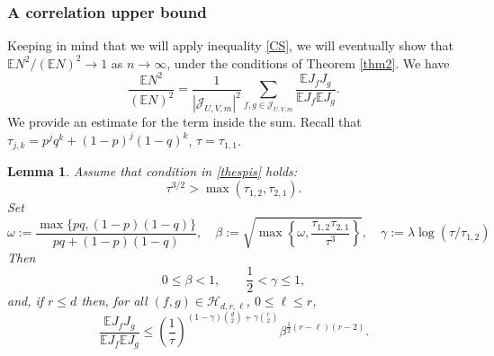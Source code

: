 \documentclass[reqno]{amsart}
\theoremstyle{theorem}
\newtheorem{lemma}[theorem]{Lemma}
\theoremstyle{definition}
\theoremstyle{remark}
\def\E{\mathbb{E}}
\def\HH{\mathscr{H}}
\newcommand{\1}{{\text{\Large $\mathfrak 1$}}}	%
\numberwithin{equation}{section}
\def\JJ{\mathscr J}
\begin{document}
\subsubsection{\bfseries A correlation upper bound}
Keeping in mind that we will apply inequality \eqref{CS}, we will 
eventually show that $\E N^2/(\E N)^2 \to 1$ as $n \to \infty$, under the
conditions of Theorem \ref{thm2}.
We have
\[
\frac{\E N^2}{(\E N)^2} =
\frac{1}{|\JJ_{U,V,m}|^{2}} \sum_{f,g \in \JJ_{U,V,m}}
\frac{\E J_f J_g} { \E J_f \E J_g}.
\]
We provide an estimate for the term inside the sum.
Recall that $\tau_{j,k} = p^j q^k+(1-p)^j(1-q)^k$, $\tau=\tau_{1,1}$.




\begin{lemma}
\label{shuplem}
Assume that condition in \eqref{thespis} holds:
\[
\tau^{3/2} > \max(\tau_{1,2}, \tau_{2,1}).
\]
Set
\begin{equation}
\omega := \frac{\max\{pq, (1-p)(1-q)\}}{pq + (1-p)(1-q)}, 
\quad
\beta := \sqrt{\max\left\{\omega, \frac{\tau_{1, 2}\tau_{2, 1}}{\tau^3}\right\}},
\quad
\gamma := \lambda \log (\tau/\tau_{1,2})
\label{gammadef}
\end{equation} 
Then
\[
0 \le \beta < 1, \qquad \frac{1}{2} < \gamma \le 1,
\]
and, if $r \le d$ then,
for all $(f,g) \in \HH_{d,r,\ell}$, $0 \le \ell \le r$,
\begin{equation} 
\label{shupeq}
\frac{\E J_f J_g}{\E J_f \E J_g}
\le  \left( \frac{1}{\tau} \right)^{(1-\gamma)\binom{d}{2} + \gamma\binom{r}{2}}
\beta^{\frac{1}{2}(r - \ell)(r-2)}.
\end{equation}
\end{lemma}
\end{document}
